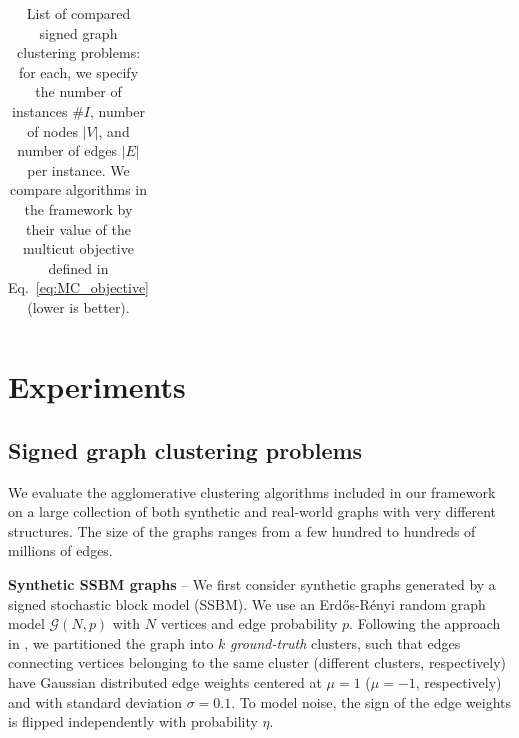 \begin{table}[tp]
\begin{subtable}[t!]{\textwidth}
\begin{tabular}{l  c  r  c  c  | r r r r r r}


        \end{tabular}
    \end{subtable} 
    \caption{List of compared signed graph clustering problems: for each, we specify the number of instances $\# I$, number of nodes $|V|$, and number of edges $|E|$ per instance. We compare algorithms in the \algname{} framework by their value of the multicut objective defined in Eq.~\ref{eq:MC_objective} (lower is better).} 
    \label{tab:datasets_and_energies}
\end{table}


\section{Experiments}\label{sec:neuro_segm_exp}
\subsection{Signed graph clustering problems} \label{sec:clustering_problems}
We evaluate the agglomerative clustering algorithms included in our framework on a large collection of both synthetic and real-world graphs with very different structures. The size of the graphs ranges from a few hundred to hundreds of millions of edges.

\textbf{Synthetic SSBM graphs} -- We first consider synthetic graphs generated by a signed stochastic block model (SSBM). We use an Erd\H os-R\'enyi random graph model $\mathcal{G}(N,p)$ with $N$ vertices and edge probability $p$. Following the approach in \cite{Cucuringu2019SPONGEAG}, we partitioned the graph into $k$ \emph{ground-truth} clusters, such that edges connecting vertices belonging to the same cluster (different clusters, respectively) have Gaussian distributed edge weights centered at $\mu=1$ ($\mu=-1$, respectively) and with standard deviation $\sigma=0.1$. To model noise, the sign of the edge weights is flipped independently with probability $\eta$.


